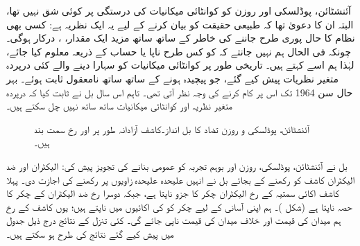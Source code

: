 آئنشٹائن، پوڈلسکی اور روزن کو کوانٹائی میکانیات کی درستگی پر کوئی شق نہیں تھا، البتہ ان کا دعویٰ تھا کہ طبیعی حقیقت کو بیان کرنے کے لیے یہ ایک نظریہ ہے: کسی بھی نظام کا حال پوری طرح جاننے کی خاطر  کے ساتھ ساتھ مزید ایک مقدار، ، درکار ہوگی۔ چونکہ فی الحال ہم نہیں جانتے کہ  کو کس طرح ناپا یا حساب کے ذریعہ معلوم کیا جائے، لہٰذا ہم اسے  کہتے ہیں۔ تاریخی طور پر کوانٹائی میکانیات کو سہارا دینے والے کئی درپردہ متغیر نظریات پیش کیے گئے، جو پیچیدہ ہونے کے ساتھ ساتھ نامعقول ثابت ہوئے۔ بہر حال سن \num{1964} تک اس پر کام کرنے کی وجہ نظر آتی تھی۔ تاہم اس سال بل نے ثابت کیا کہ درپردہ متغیر نظریہ اور کوانٹائی میکانیات ساتھ ساتھ نہیں چل سکتے ہیں۔

\begin{figure}
\centering
{}
\caption{آئنشٹائن، پوڈلسکی و روزن تضاد کا بل انداز۔کاشف آزادانہ طور پر  اور  رخ سمت بند ہیں۔}
\label{شکل_بکھراو_بل_انداز}
\end{figure}


بل نے آئنشٹائن، پوڈلسکی، روزن اور بوہم تجربہ کو عمومی بنانے کی تجویز پیش کی: الیکٹران اور ضد الیکٹران کاشف کو  رکھنے کے بجائے بل نے انہیں علیحدہ علیحدہ زاویوں پر رکھنے کی اجازت دی۔ پہلا کاشف اکائی سمتیہ  کے رخ الیکٹران چکر کا جزو ناپتا ہے، جبکہ دوسرا  رخ ضد الیکٹران کے چکر کا حصہ ناپتا ہے (شکل )۔ ہم اپنی آسانی کے لیے چکر کو  کی اکائیوں میں ناپتے ہیں؛ یوں کاشف کے رخ ہم میدان کی قیمت  اور خلاف میدان کی قیمت  ناپی جائے گی۔ کئی  تنزل کے نتائج درج ذیل جدول میں پیش کیے گئے نتائج کی طرح ہو سکتے ہیں۔

